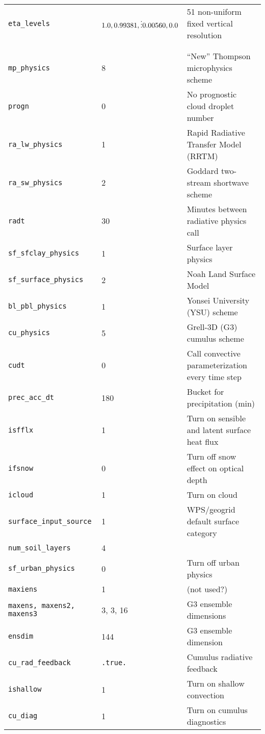 \begin{singlespacing}
\begin{longtable}{p{2.0in}p{0.9in}p{3.2in}}
{\tt eta\_levels} & $1.0, 0.99381, \newline \vdots \newline 0.00560, 0.0$ & 51 non-uniform fixed vertical resolution \\
\\
\hspace{-.2in}{\tt \&physics} \\
{\tt mp\_physics} & 8 & ``New'' Thompson microphysics scheme \\
{\tt progn} & 0 & No prognostic cloud droplet number \\
{\tt ra\_lw\_physics} & 1 & Rapid Radiative Transfer Model (RRTM)\\
{\tt ra\_sw\_physics} & 2 & Goddard two-stream shortwave scheme \\
{\tt radt} & 30 & Minutes between radiative physics call \\
{\tt sf\_sfclay\_physics} & 1 & Surface layer physics \\
{\tt sf\_surface\_physics} & 2 & Noah Land Surface Model \\
{\tt bl\_pbl\_physics} & 1 & Yonsei University (YSU) scheme \\
{\tt cu\_physics} & 5 & Grell-3D (G3) cumulus scheme \\
{\tt cudt} & 0 & Call convective parameterization every time step\\
{\tt prec\_acc\_dt} & 180 & Bucket for precipitation (\unit{min}) \\
{\tt isfflx} & 1 & Turn on sensible and latent surface heat flux \\
{\tt ifsnow} & 0 & Turn off snow effect on optical depth \\
{\tt icloud} & 1 & Turn on cloud \\
{\tt surface\_input\_source} & 1 & WPS/geogrid default surface category \\
{\tt num\_soil\_layers} & 4 \\
{\tt sf\_urban\_physics} & 0 & Turn off urban physics \\
{\tt maxiens} & 1 & (not used?) \\
{\tt maxens, maxens2, maxens3 } & 3, 3, 16 & G3 ensemble dimensions\\
{\tt ensdim} & 144 & G3 ensemble dimension \\
{\tt cu\_rad\_feedback} & {\tt .true.} & Cumulus radiative feedback \\
{\tt ishallow} & 1 & Turn on shallow convection \\
{\tt cu\_diag} & 1 & Turn on cumulus diagnostics \\

\end{longtable}
\end{singlespacing}
